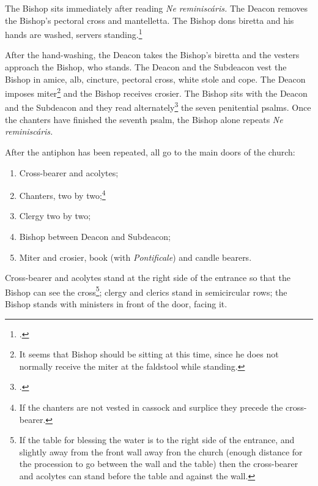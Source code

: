 \documentclass[letterpaper]{report}
\begin{document}
{    \rubric The Bishop sits immediately after reading \textit{Ne
    reminisc\'aris.} The Deacon removes the Bishop's pectoral cross and
    mantelletta. The Bishop dons biretta and his hands are washed, servers
    standing.\footcite[See][note 1, p. 39.]{consecranda}

    \rubric After the hand-washing, the Deacon takes the Bishop's biretta and
    the vesters approach the Bishop, who stands. The Deacon and the Subdeacon
    vest the Bishop in amice, alb, cincture, pectoral cross, white stole and
    cope. The Deacon imposes miter\footnote{It seems that Bishop should be
    sitting at this time, since he does not normally receive the miter at the
    faldstool while standing.} and the Bishop receives crosier. The Bishop sits
    with the Deacon and the Subdeacon and they read alternately\footcite[The
    bishop usually reads the first verse of each psalm and recites the verse
    \textit{Gl\'oria Patri.}][note 3, p. 39.]{consecranda} the seven
    penitential psalms. Once the chanters have finished the seventh psalm, the
    Bishop alone repeats \textit{Ne reminisc\'aris.}

    \rubric After the antiphon has been repeated, all go to the main doors of
    the church:

    \begin{enumerate}

        \item Cross-bearer and acolytes;

        \item Chanters, two by two;\footnote{If the chanters are not vested in
            cassock and surplice they precede the cross-bearer.}

        \item Clergy two by two;

        \item Bishop between Deacon and Subdeacon;

        \item Miter and crosier, book (with \textit{Pontificale}) and candle
            bearers.

    \end{enumerate}

    Cross-bearer and acolytes stand at the right side of the entrance so that
    the Bishop can see the cross\footnote{If the table for blessing the water
    is to the right side of the entrance, and slightly away from the front wall
    away fron the church (enough distance for the procession to go between the
    wall and the table) then the cross-bearer and acolytes can stand before the
    table and against the wall.}; clergy and clerics stand in semicircular
    rows; the Bishop stands with ministers in front of the door, facing it.

}
\end{document}
